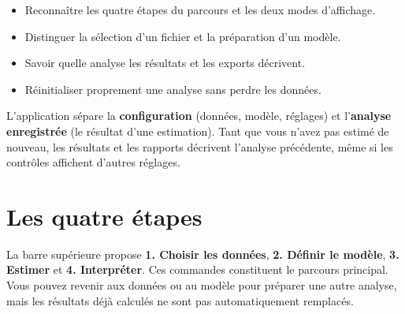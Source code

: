 \documentclass[
  french,
  11pt,
  a4paper,
  DIV=11,
  numbers=noendperiod]{scrreprt}
\providecommand{\tightlist}{%
  \setlength{\itemsep}{0pt}\setlength{\parskip}{0pt}}
\begin{document}
\begin{tcolorbox}[enhanced jigsaw, arc=.35mm, bottomrule=.15mm, bottomtitle=1mm, breakable, colback=white, colbacktitle=quarto-callout-note-color!10!white, colframe=quarto-callout-note-color-frame, coltitle=black, left=2mm, leftrule=.75mm, opacityback=0, opacitybacktitle=0.6, rightrule=.15mm, title={Objectifs du chapitre}, titlerule=0mm, toprule=.15mm, toptitle=1mm]

\begin{itemize}
\tightlist
\item
  Reconnaître les quatre étapes du parcours et les deux modes
  d'affichage.
\item
  Distinguer la sélection d'un fichier et la préparation d'un modèle.
\item
  Savoir quelle analyse les résultats et les exports décrivent.
\item
  Réinitialiser proprement une analyse sans perdre les données.
\end{itemize}

\end{tcolorbox}

\begin{tcolorbox}[enhanced jigsaw, arc=.35mm, bottomrule=.15mm, bottomtitle=1mm, breakable, colback=white, colbacktitle=quarto-callout-tip-color!10!white, colframe=quarto-callout-tip-color-frame, coltitle=black, left=2mm, leftrule=.75mm, opacityback=0, opacitybacktitle=0.6, rightrule=.15mm, title={Idée centrale}, titlerule=0mm, toprule=.15mm, toptitle=1mm]

L'application sépare la \textbf{configuration} (données, modèle,
réglages) et l'\textbf{analyse enregistrée} (le résultat d'une
estimation). Tant que vous n'avez pas estimé de nouveau, les résultats
et les rapports décrivent l'analyse précédente, même si les contrôles
affichent d'autres réglages.

\end{tcolorbox}

\section{Les quatre étapes}\label{les-quatre-uxe9tapes}

La barre supérieure propose \textbf{1. Choisir les données}, \textbf{2.
Définir le modèle}, \textbf{3. Estimer} et \textbf{4. Interpréter}. Ces
commandes constituent le parcours principal. Vous pouvez revenir aux
données ou au modèle pour préparer une autre analyse, mais les résultats
déjà calculés ne sont pas automatiquement remplacés.
\end{document}
